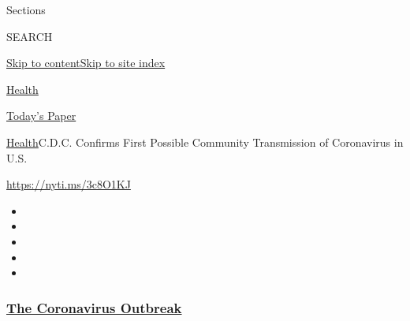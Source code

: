 Sections

SEARCH

\protect\hyperlink{site-content}{Skip to
content}\protect\hyperlink{site-index}{Skip to site index}

\href{https://www.nytimes3xbfgragh.onion/section/health}{Health}

\href{https://myaccount.nytimes3xbfgragh.onion/auth/login?response_type=cookie\&client_id=vi}{}

\href{https://www.nytimes3xbfgragh.onion/section/todayspaper}{Today's
Paper}

\href{/section/health}{Health}\textbar{}C.D.C. Confirms First Possible
Community Transmission of Coronavirus in U.S.

\url{https://nyti.ms/3c8O1KJ}

\begin{itemize}
\item
\item
\item
\item
\item
\end{itemize}

\hypertarget{the-coronavirus-outbreak}{%
\subsubsection{\texorpdfstring{\href{https://www.nytimes3xbfgragh.onion/news-event/coronavirus?name=styln-coronavirus-national\&region=TOP_BANNER\&variant=undefined\&block=storyline_menu_recirc\&action=click\&pgtype=Article\&impression_id=ad158fe0-e3a2-11ea-87e8-83b655896aaa}{The
Coronavirus
Outbreak}}{The Coronavirus Outbreak}}\label{the-coronavirus-outbreak}}

